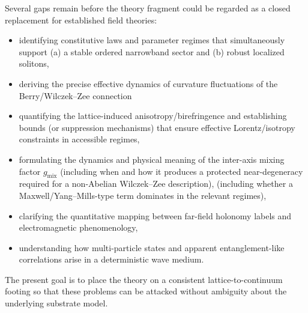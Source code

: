 Several gaps remain before the theory fragment could be regarded as a closed replacement for established field theories:
\begin{itemize}
\item identifying constitutive laws and parameter regimes that simultaneously support (a) a stable ordered narrowband
sector and (b) robust localized solitons,
\item deriving the precise effective dynamics of curvature fluctuations of the Berry/Wilczek--Zee connection
\item quantifying the lattice-induced anisotropy/birefringence and establishing bounds (or suppression mechanisms)
that ensure effective Lorentz/isotropy constraints in accessible regimes,
\item formulating the dynamics and physical meaning of the inter-axis mixing factor $g_{\mathrm{mix}}$ (including when and how it
produces a protected near-degeneracy required for a non-Abelian Wilczek--Zee description),
(including whether a Maxwell/Yang--Mills-type term dominates in the relevant regimes),
\item clarifying the quantitative mapping between far-field holonomy labels and electromagnetic phenomenology,
\item understanding how multi-particle states and apparent entanglement-like correlations arise in a deterministic
wave medium.
\end{itemize}
The present goal is to place the theory on a consistent lattice-to-continuum footing so that these problems can be
attacked without ambiguity about the underlying substrate model.
